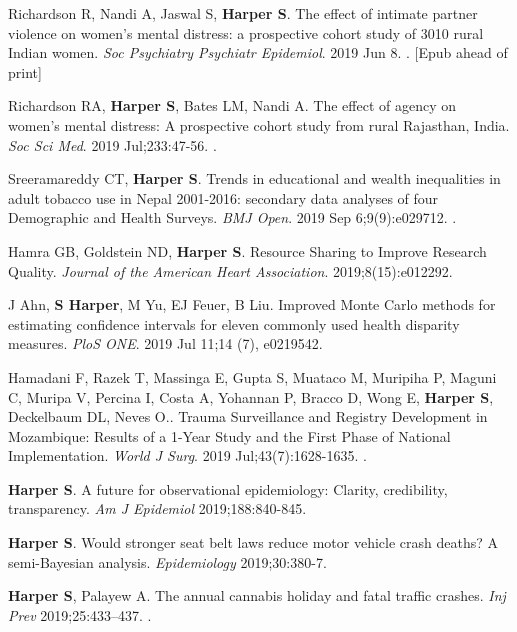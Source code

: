 \documentclass[
  letterpaper,
  DIV=11,
  numbers=noendperiod]{scrartcl}
\begin{document}
\begin{etaremune}
\item *Richardson R, Nandi A, Jaswal S, \textbf{Harper S}. The effect of intimate partner violence on women's mental distress: a prospective cohort study of 3010 rural Indian women. \emph{Soc Psychiatry Psychiatr Epidemiol}. 2019 Jun 8. . [Epub ahead of print]

\item *Richardson RA, \textbf{Harper S}, Bates LM, Nandi A. The effect of agency on women's mental distress: A prospective cohort study from rural Rajasthan, India. \emph{Soc Sci Med}. 2019 Jul;233:47-56. .

\item Sreeramareddy CT, \textbf{Harper S}. Trends in educational and wealth inequalities in adult tobacco use in Nepal 2001-2016: secondary data analyses of four Demographic and Health Surveys. \emph{BMJ Open}. 2019 Sep 6;9(9):e029712. .

\item Hamra GB, Goldstein ND, \textbf{Harper S}. Resource Sharing to Improve Research Quality. \emph{Journal of the American Heart Association}. 2019;8(15):e012292.

\item J Ahn, \textbf{S Harper}, M Yu, EJ Feuer, B Liu. Improved Monte Carlo methods for estimating confidence intervals for eleven commonly used health disparity measures. \emph{PloS ONE}. 2019 Jul 11;14 (7), e0219542.

\item Hamadani F, Razek T, Massinga E, Gupta S, Muataco M, Muripiha P, Maguni C, Muripa V, Percina I, Costa A, Yohannan P, Bracco D, Wong E, \textbf{Harper S}, Deckelbaum DL, Neves O.. Trauma Surveillance and Registry Development in Mozambique: Results of a 1-Year Study and the First Phase of National Implementation. \emph{World J Surg}. 2019 Jul;43(7):1628-1635. .

\item \textbf{Harper S}. A future for observational epidemiology: Clarity, credibility, transparency. \emph{Am J Epidemiol} 2019;188:840-845.

\item \textbf{Harper S}. Would stronger seat belt laws reduce motor vehicle crash deaths? A semi-Bayesian analysis. \emph{Epidemiology} 2019;30:380-7.

\item \textbf{Harper S}, Palayew A. The annual cannabis holiday and fatal traffic crashes. \emph{Inj Prev} 2019;25:433–437. .


\end{etaremune}
\end{document}
